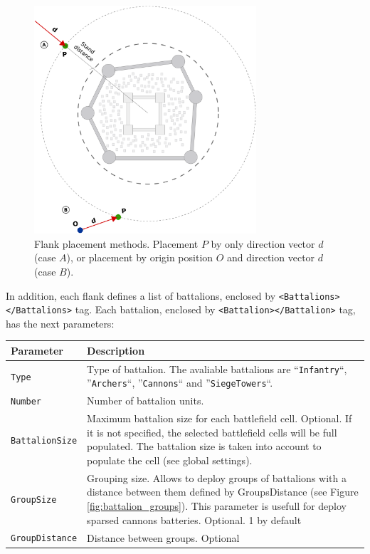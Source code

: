 \documentclass[tog]{acmsiggraph}
\begin{document}
 
\begin{figure}[h]
  \centering
  \includegraphics[width=3.25in]{figs/battle_events}
  \caption{Flank placement methods. Placement $P$ by only direction vector $d$ (case $A$), or placement by origin position $O$ and direction vector $d$ (case $B$). }
  \label{fig:battle_events}
\end{figure}
 
 
 
In addition, each flank defines a list of battalions, enclosed by \texttt{<Battalions></Battalions>} tag.
Each battalion, enclosed by \texttt{<Battalion></Battalion>} tag, has the next parameters:


\begin{tabularx}{0.48\textwidth}{ |l|X| }
\hline 
\textbf{Parameter} & \textbf{Description} \\[0.15cm]
 \hline
 \texttt{Type} & Type of battalion. The avaliable battalions are ``\texttt{Infantry}``, ''\texttt{Archers}``, ''\texttt{Cannons}`` and ''\texttt{SiegeTowers}``. \\
 \hline
 \texttt{Number} & Number of battalion units. \\
 \hline
 \texttt{BattalionSize} & Maximum battalion size for each battlefield cell. Optional. If it is not specified, the selected battlefield cells will be full populated. The battalion size is taken into account to populate the cell (see global settings). \\
 \hline
 \texttt{GroupSize} & Grouping size. Allows to deploy groups of battalions with a distance between them defined by GroupsDistance (see Figure \ref{fig:battalion_groups}). This parameter is usefull for deploy sparsed cannons batteries. Optional. 1 by default \\
 \hline
 \texttt{GroupDistance} & Distance between groups. Optional \\
 \hline
\end{tabularx} 
\end{document}

